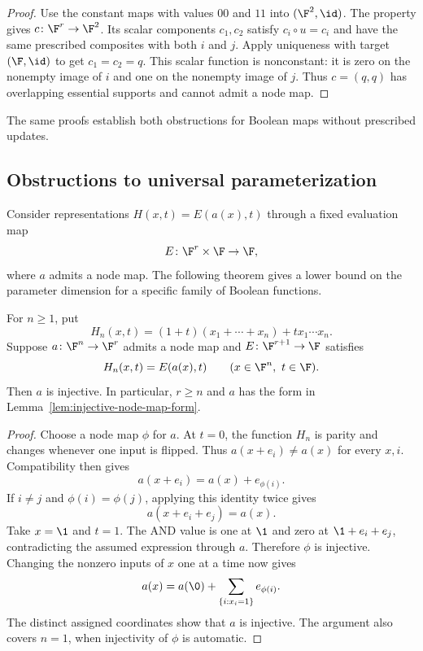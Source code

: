 \begin{proof}
Use the constant maps with values $00$ and $11$ into $(\F^2,\id)$. The property gives $c\colon\F^r\to\F^2$. Its scalar components $c_1,c_2$ satisfy $c_i\circ u=c_i$ and have the same prescribed composites with both $i$ and $j$. Apply uniqueness with target $(\F,\id)$ to get $c_1=c_2=q$. This scalar function is nonconstant: it is zero on the nonempty image of $i$ and one on the nonempty image of $j$. Thus $c=(q,q)$ has overlapping essential supports and cannot admit a node map.
\end{proof}

The same proofs establish both obstructions for Boolean maps without prescribed updates.

\subsection{Obstructions to universal parameterization}\label{subsec:compatible-parameterizations}

Consider representations $H(x,t)=E(a(x),t)$ through a fixed evaluation map
\[
    E\colon\F^r\times\F\to\F,
\]
where $a$ admits a node map. The following theorem gives a lower bound on the parameter dimension for a specific family of Boolean functions.

\begin{theorem}\label{thm:parity-and-observations}
For $n\geq1$, put
\[
    H_n(x,t)=(1+t)(x_1+\cdots+x_n)+t x_1\cdots x_n.
\]
Suppose $a\colon\F^n\to\F^r$ admits a node map and $E\colon\F^{r+1}\to\F$ satisfies
\[
    H_n(x,t)=E(a(x),t)\qquad(x\in\F^n,\ t\in\F).
\]
Then $a$ is injective. In particular, $r\geq n$ and $a$ has the form in Lemma~\ref{lem:injective-node-map-form}.
\end{theorem}

\begin{proof}
Choose a node map $\phi$ for $a$. At $t=0$, the function $H_n$ is parity and changes whenever one input is flipped. Thus $a(x+e_i)\ne a(x)$ for every $x,i$. Compatibility then gives
\[
    a(x+e_i)=a(x)+e_{\phi(i)}.
\]
If $i\ne j$ and $\phi(i)=\phi(j)$, applying this identity twice gives
\[
    a(x+e_i+e_j)=a(x).
\]
Take $x=\1$ and $t=1$. The AND value is one at $\1$ and zero at $\1+e_i+e_j$, contradicting the assumed expression through $a$. Therefore $\phi$ is injective. Changing the nonzero inputs of $x$ one at a time now gives
\[
    a(x)=a(\0)+\sum_{\{i:x_i=1\}}e_{\phi(i)}.
\]
The distinct assigned coordinates show that $a$ is injective. The argument also covers $n=1$, when injectivity of $\phi$ is automatic.
\end{proof}

